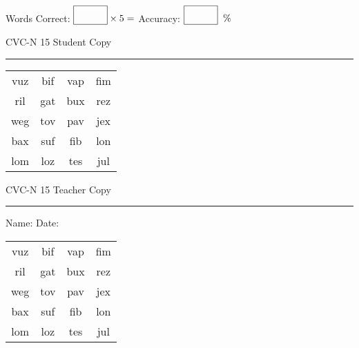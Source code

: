 \documentclass{memoir}
\begin{document}
\small

Words Correct: $\fbox{\phantom{\huge 100}} \times 5 = $ Accuracy: $\fbox{\phantom{\huge 100}}\;\; \%$ 

\vfill

\newpage


\footnotesize \noindent
CVC-N 15 \hfill Student Copy
\smallskip
\hrule

\Large

\setlength{\tabcolsep}{14pt}
\def\arraystretch{2}

{\selectfont


\begin{vplace}[0.5]
\begin{center}
\begin{tabular}{cccc}
vuz & bif & vap & fim \\
ril & gat & bux & rez \\
weg & tov & pav & jex \\
bax & suf & fib & lon \\
lom & loz & tes & jul \\
\end{tabular}
\end{center}
\end{vplace}

}

\newpage

\footnotesize \noindent
CVC-N 15 \hfill Teacher Copy
\smallskip
\hrule

\small

\vfill

\noindent
Name: \underline{\hspace{1.75in}} \hfill Date: \underline{\hspace{1in}}

\Large

{\selectfont


\begin{vplace}[0.5]
\begin{center}
\begin{tabular}{cccc}
vuz & bif & vap & fim \\
ril & gat & bux & rez \\
weg & tov & pav & jex \\
bax & suf & fib & lon \\
lom & loz & tes & jul \\
\end{tabular}
\end{center}
\end{vplace}



}
\end{document}
